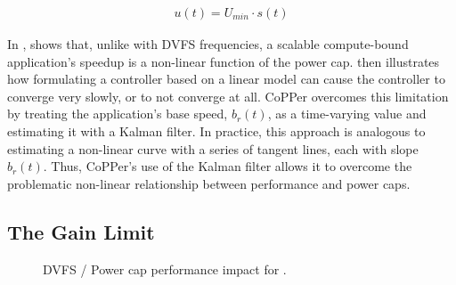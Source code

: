 \begin{eqnarray}
  u(t) = U_{min} \cdot s(t)
  \label{eqn:new-powercap}
\end{eqnarray}

In ,  shows that, unlike with DVFS frequencies, a scalable compute-bound application's speedup is a non-linear function of the power cap.
 then illustrates how formulating a controller based on a linear model can cause the controller to converge very slowly, or to not converge at all.
CoPPer overcomes this limitation by treating the application's base speed, $b_r(t)$, as a time-varying value and estimating it with a Kalman filter.
In practice, this approach is analogous to estimating a non-linear curve with a series of tangent lines, each with slope $b_r(t)$.
Thus, CoPPer's use of the Kalman filter allows it to overcome the problematic non-linear relationship between performance and power caps.


\subsection{The Gain Limit}
\label{sec:copper-framework-gain}

\begin{figure}[t]
  \centering
  \subfloat[DVFS]%
  {%
  \label{fig:copper-tradeoffs-hop-dvfs}}
  \caption{DVFS / Power cap performance impact for .}
  \label{fig:copper-tradeoffs-hop}
\end{figure}

